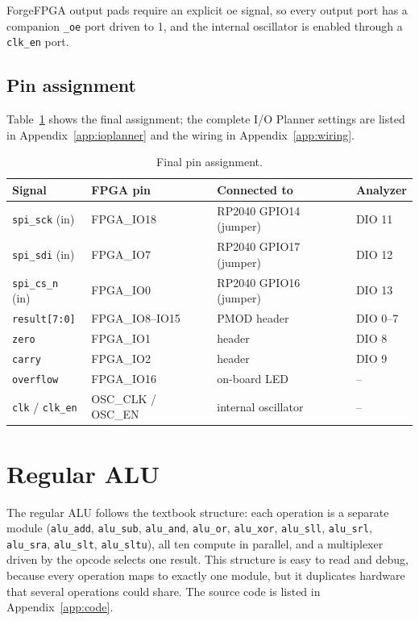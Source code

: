 \documentclass[12pt,a4paper,twoside]{article}
\begin{document}
ForgeFPGA output pads require an explicit \gls{oe} signal, so
every output port has a companion \texttt{\_oe} port driven to 1, and the internal
oscillator is enabled through a \texttt{clk\_en} port.

\subsection{Pin assignment}

Table~\ref{tab:pins} shows the final assignment; the complete
I/O Planner settings are listed in Appendix~\ref{app:ioplanner} and the wiring in
Appendix~\ref{app:wiring}.

\begin{table}[H]
\centering
\caption{Final pin assignment.}
\label{tab:pins}
\begin{tabular}{@{}llll@{}}
\toprule
\textbf{Signal} & \textbf{FPGA pin} & \textbf{Connected to} & \textbf{Analyzer} \\
\midrule
\texttt{spi\_sck}  (in)  & FPGA\_IO18 & RP2040 GPIO14 (jumper) & DIO 11 \\
\texttt{spi\_sdi}  (in)  & FPGA\_IO7  & RP2040 GPIO17 (jumper) & DIO 12 \\
\texttt{spi\_cs\_n} (in) & FPGA\_IO0  & RP2040 GPIO16 (jumper) & DIO 13 \\
\texttt{result[7:0]}     & FPGA\_IO8--IO15 & PMOD header & DIO 0--7 \\
\texttt{zero}            & FPGA\_IO1  & header & DIO 8 \\
\texttt{carry}           & FPGA\_IO2  & header & DIO 9 \\
\texttt{overflow}        & FPGA\_IO16 & on-board LED & -- \\
\texttt{clk} / \texttt{clk\_en} & OSC\_CLK / OSC\_EN & internal oscillator & -- \\
\bottomrule
\end{tabular}
\end{table}

\section{Regular ALU}
\label{sec:regular}

The regular ALU follows the textbook structure: each operation is
a separate module (\texttt{alu\_add}, \texttt{alu\_sub}, \texttt{alu\_and},
\texttt{alu\_or}, \texttt{alu\_xor}, \texttt{alu\_sll}, \texttt{alu\_srl},
\texttt{alu\_sra}, \texttt{alu\_slt}, \texttt{alu\_sltu}), all ten compute in
parallel, and a multiplexer driven by the opcode selects one result. This structure
is easy to read and debug, because every operation maps to exactly one module, but
it duplicates hardware that several operations could share. The source code is
listed in Appendix~\ref{app:code}.
\end{document}
